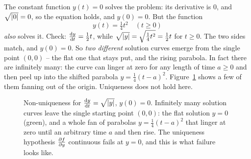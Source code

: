 \begin{example}
\label{ch36:ex-nonunique}
The constant function $y(t) = 0$ solves the problem: its derivative is $0$, and $\sqrt{\lvert0\rvert} = 0$, so the equation holds, and $y(0)=0$. But the function
\[
  y(t) = \tfrac{1}{4}t^2 \quad (t \ge 0)
\]
\emph{also} solves it. Check: $\frac{\mathrm{d} y}{\mathrm{d} t} = \tfrac{1}{2}t$, while $\sqrt{\lvert y\rvert} = \sqrt{\tfrac{1}{4}t^2} = \tfrac{1}{2}t$ for $t\ge 0$. The two sides match, and $y(0)=0$. So \emph{two different} solution curves emerge from the single point $(0,0)$ -- the flat one that stays put, and the rising parabola. In fact there are infinitely many: the curve can linger at zero for any length of time $a\ge 0$ and then peel up into the shifted parabola $y=\tfrac14(t-a)^2$. Figure~\ref{ch36:fig-branch} shows a few of them fanning out of the origin. Uniqueness does not hold here.
\end{example}

\begin{figure}[H]
\centering
{}
\caption{Non-uniqueness for $\frac{\mathrm{d} y}{\mathrm{d} t}=\sqrt{\lvert y\rvert}$, $y(0)=0$. Infinitely many solution curves leave the single starting point $(0,0)$: the flat solution $y=0$ (green), and a whole fan of parabolas $y=\tfrac14(t-a)^2$ that linger at zero until an arbitrary time $a$ and then rise. The uniqueness hypothesis $\frac{\partial f}{\partial y}$ continuous fails at $y=0$, and this is what failure looks like.}
\label{ch36:fig-branch}
\end{figure}

